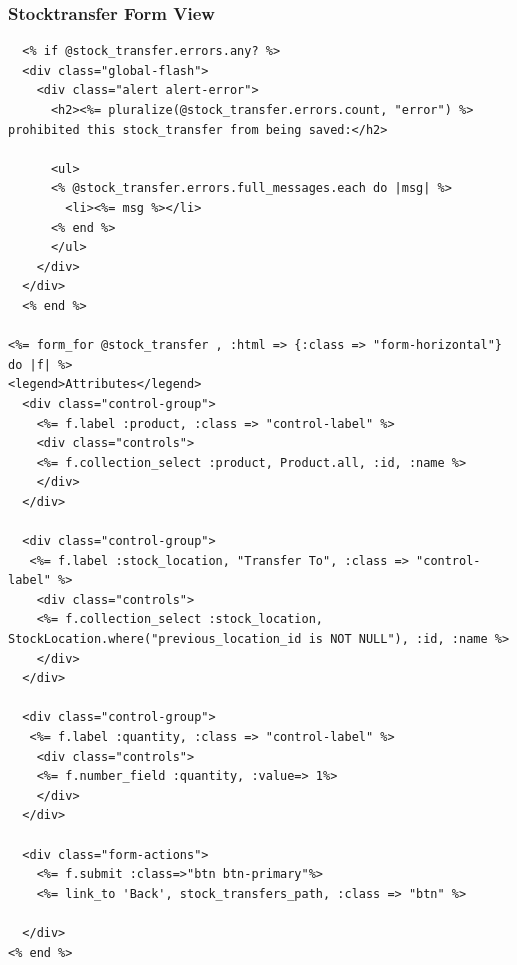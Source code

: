 \documentclass[a4paper]{article}
\begin{document}
\subsubsection{Stocktransfer Form View}
\begin{verbatim}
  <% if @stock_transfer.errors.any? %>
  <div class="global-flash">
    <div class="alert alert-error">
      <h2><%= pluralize(@stock_transfer.errors.count, "error") %> prohibited this stock_transfer from being saved:</h2>

      <ul>
      <% @stock_transfer.errors.full_messages.each do |msg| %>
        <li><%= msg %></li>
      <% end %>
      </ul>
    </div>
  </div>
  <% end %>

<%= form_for @stock_transfer , :html => {:class => "form-horizontal"} do |f| %>
<legend>Attributes</legend>
  <div class="control-group">
    <%= f.label :product, :class => "control-label" %>
    <div class="controls">
    <%= f.collection_select :product, Product.all, :id, :name %>
    </div>
  </div>

  <div class="control-group">
   <%= f.label :stock_location, "Transfer To", :class => "control-label" %>
    <div class="controls">
    <%= f.collection_select :stock_location, StockLocation.where("previous_location_id is NOT NULL"), :id, :name %>
    </div>
  </div>

  <div class="control-group">
   <%= f.label :quantity, :class => "control-label" %>
    <div class="controls">
    <%= f.number_field :quantity, :value=> 1%>
    </div>
  </div>

  <div class="form-actions">
    <%= f.submit :class=>"btn btn-primary"%>
    <%= link_to 'Back', stock_transfers_path, :class => "btn" %>

  </div>
<% end %>

\end{verbatim}
\end{document}
